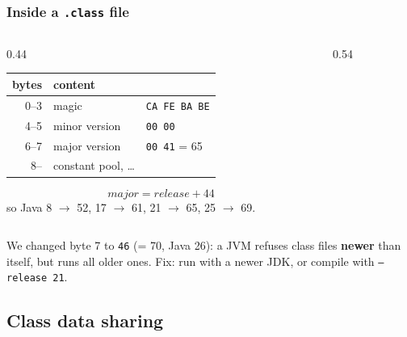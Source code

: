 \documentclass[aspectratio=169,10pt,compress]{beamer}
\begin{document}




\begin{frame}[t,fragile] \frametitle{Inside a \texttt{.class} file}
  \begin{columns}[T]
    \begin{column}{0.44\textwidth}
      \begin{center}\small
      \begin{tabular}{rll}
        \toprule
        bytes & content & \\
        \midrule
        0--3  & magic             & \texttt{CA FE BA BE} \\
        4--5  & minor version     & \texttt{00 00} \\
        6--7  & major version     & \texttt{00 41} = 65 \\
        8--   & constant pool, \dots & \\
        \bottomrule
      \end{tabular}
      \end{center}
      \[
      	\mathit{major} = \mathit{release} + 44
      \]
      \small so Java 8 \(\to\) 52, 17 \(\to\) 61, 21 \(\to\) 65, 25 \(\to\) 69.
    \end{column}
    \begin{column}{0.54\textwidth}
    \end{column}
  \end{columns}
  \vspace{0.2em}
  \small We changed byte 7 to \texttt{46} (= 70, Java 26): a JVM refuses class files \textbf{newer} than itself, but runs all older ones.
  Fix: run with a newer JDK, or compile with \texttt{--release 21}.
\end{frame}


\subsection[CDS]{Class data sharing}
\end{document}
